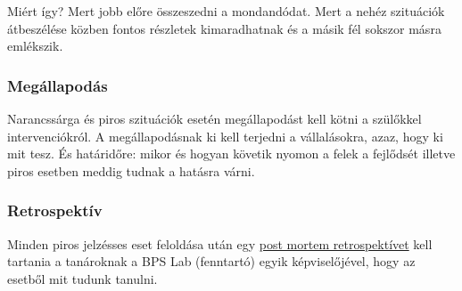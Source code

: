 Miért így? Mert jobb előre összeszedni a mondandódat. Mert a nehéz
szituációk átbeszélése közben fontos részletek kimaradhatnak és a másik
fél sokszor másra emlékszik.

\hypertarget{megallapodas}{%
\subsubsection{Megállapodás}\label{megallapodas}}

Narancssárga és piros szituációk esetén megállapodást kell kötni a
szülőkkel intervenciókról. A megállapodásnak ki kell terjedni a
vállalásokra, azaz, hogy ki mit tesz. És határidőre: mikor és hogyan
követik nyomon a felek a fejlődsét illetve piros esetben meddig tudnak a
hatásra várni.

\hypertarget{retrospektiv}{%
\subsubsection{Retrospektív}\label{retrospektiv}}

Minden piros jelzésses eset feloldása után egy
\href{https://www.pagerduty.com/blog/postmortems-vs-retrospectives/}{post
mortem retrospektívet} kell tartania a tanároknak a BPS Lab (fenntartó)
egyik képviselőjével, hogy az esetből mit tudunk tanulni.
